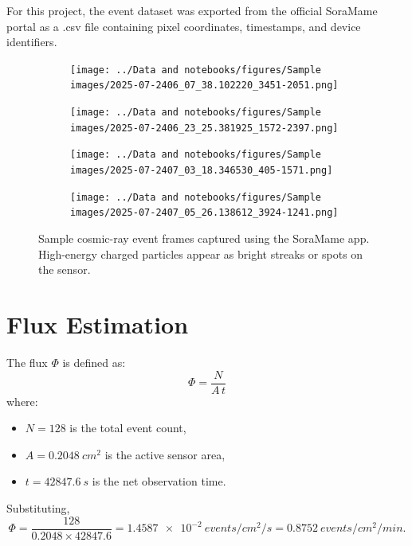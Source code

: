 \documentclass[12pt]{article}
\begin{document}
	For this project, the event dataset was exported from the official SoraMame portal as a .csv file containing pixel coordinates, timestamps, and device identifiers.
	
\begin{figure}[H]
	\centering
	\begin{subfigure}[b]{0.45\textwidth}
		\texttt{[image: ../Data and notebooks/figures/Sample images/2025-07-2406\_07\_38.102220\_3451-2051.png]}
		\caption{}
		
	\end{subfigure}
	\hfill
	\begin{subfigure}[b]{0.45\textwidth}
		\texttt{[image: ../Data and notebooks/figures/Sample images/2025-07-2406\_23\_25.381925\_1572-2397.png]}
		\caption{}
	\end{subfigure}
	\vspace{0.5em}
	
	\begin{subfigure}[b]{0.45\textwidth}
		\texttt{[image: ../Data and notebooks/figures/Sample images/2025-07-2407\_03\_18.346530\_405-1571.png]}
		\caption{}
	\end{subfigure}
	\hfill
	\begin{subfigure}[b]{0.45\textwidth}
		\texttt{[image: ../Data and notebooks/figures/Sample images/2025-07-2407\_05\_26.138612\_3924-1241.png]}
		\caption{}
	\end{subfigure}
	
	\caption{Sample cosmic-ray event frames captured using the SoraMame app. High-energy charged particles appear as bright streaks or spots on the sensor.}
	\label{fig:soramame_grid}
\end{figure}

	
	\section{Flux Estimation}
	The flux $\Phi$ is defined as:
	\begin{equation}
		\Phi = \frac{N}{A\,t}
	\end{equation}
	where:
	\begin{itemize}
		\item $N = 128$ is the total event count,
		\item $A = \SI{0.2048}{cm^2}$ is the active sensor area,
		\item $t = \SI{42847.6}{s}$ is the net observation time.
	\end{itemize}
	Substituting,
	\[
	\Phi = \frac{128}{0.2048 \times 42847.6} = \SI{1.4587e-2}{events/cm^2/s} = \SI{0.8752}{events/cm^2/min}.
	\]
	
\end{document}
